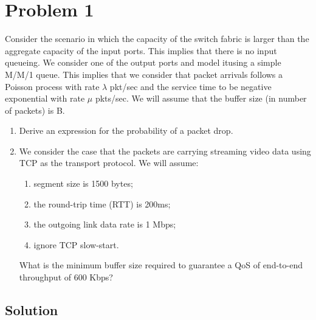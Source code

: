 \section*{Problem 1}

Consider the scenario in which the capacity of the switch fabric is larger than the aggregate capacity of the input ports.
This implies that there is no input queueing.
We consider one of the output ports and model itusing a simple M/M/1 queue.
This implies that we consider that packet arrivals follows a Poisson process with rate $\lambda$ pkt/sec and the service time to be negative exponential with rate $\mu$ pkts/sec.
We will assume that the buffer size (in number of packets) is B.

\begin{enumerate}
      \item Derive an expression for the probability of a packet drop.
      \item We consider the case that the packets are carrying streaming video data using TCP as the transport protocol.
            We will assume:
            \begin{enumerate}
                  \item segment size is 1500 bytes;
                  \item the round-trip time (RTT) is 200ms;
                  \item the outgoing link data rate is 1 Mbps;
                  \item ignore TCP slow-start.
            \end{enumerate}
            What is the minimum buffer size required to guarantee a QoS of end-to-end throughput of 600 Kbps?
\end{enumerate}

\subsection*{Solution}

